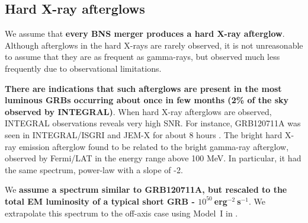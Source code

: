 \documentclass[a0,portrait]{a0poster}
\renewcommand{\emph}[1]{\textbf{\color{blue}#1}}
\begin{document}
\begin{multicols}{2}
\subsection*{Hard X-ray afterglows}

We assume that \emph{every BNS merger produces a hard X-ray afterglow}. Although
afterglows in the hard X-rays are rarely observed, it is not unreasonable to
assume that they are as frequent as gamma-rays, but observed much less
frequently due to observational limitations.

\emph{There are indications that such afterglows are present in the most luminous GRBs
occurring about once in few months (2\% of the sky observed by INTEGRAL)}.  When
hard X-ray afterglows are observed, INTEGRAL observations reveals very high
SNR. For instance, GRB120711A was seen in INTEGRAL/ISGRI and JEM-X for about 8
hours \cite{martin-carrillo14:_grb}. The bright hard X-ray emission afterglow found to
be related to the bright gamma-ray afterglow, observed by Fermi/LAT in the
energy range above 100 MeV. In particular, it had the same spectrum, power-law
with a slope of -2.

We \emph{assume a spectrum similar to GRB120711A, but rescaled to the total EM
luminosity of a typical short GRB - $10^{50}~$erg$^{-2}~$s$^{-1}$}. We extrapolate
this spectrum to the off-axis case using Model~I in \cite{2016arXiv160606124P}.




\end{multicols}
\end{document}
